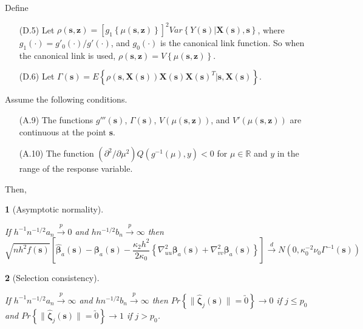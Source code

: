 \documentclass[12pt,english,authoryear, review]{article}\usepackage[]{graphicx}\usepackage[]{color}
\theoremstyle{plain}
\newtheorem{thm}{\protect\theoremname}
\theoremstyle{plain}
\providecommand{\theoremname}{Theorem}
\begin{document}
Define
\begin{itemize}
\item[(D.5)] Let $\rho\left(\bm{s},\bm{z}\right)=\left[g_{1}\left\{ \mu\left(\bm{s},\bm{z}\right)\right\} \right]^{2}Var\left\{ Y\left(\bm{s}\right)|\bm{X}\left(\bm{s}\right),\bm{s}\right\} $,
where $g_{1}\left(\cdot\right)=g'_{0}\left(\cdot\right)/g'\left(\cdot\right)$,
and $g_{0}\left(\cdot\right)$ is the canonical link function. So
when the canonical link is used, $\rho\left(\bm{s},\bm{z}\right)=V\left\{ \mu\left(\bm{s},\bm{z}\right)\right\} $.
\item[(D.6)] Let $\Gamma\left(\bm{s}\right)=E\left\{ \rho\left(\bm{s},\bm{X}\left(\bm{s}\right)\right)\bm{X}\left(\bm{s}\right)\bm{X}\left(\bm{s}\right)^{T}|\bm{s},\bm{X}\left(\bm{s}\right)\right\} $.
\end{itemize}
Assume the following conditions.
\begin{itemize}
\item[(A.9)] The functions $g'''\left(\bm{s}\right)$, $\Gamma\left(\bm{s}\right)$,
$V\left(\mu\left(\bm{s},\bm{z}\right)\right)$, and $V'\left(\mu\left(\bm{s},\bm{z}\right)\right)$
are continuous at the point $\bm{s}$.
\item[(A.10)] The function $\left(\partial^{2}/\partial\mu^{2}\right)Q\left(g^{-1}\left(\mu\right),y\right)<0$
for $\mu\in\mathbb{R}$ and $y$ in the range of the response variable.
\end{itemize}
Then,
\begin{thm}[Asymptotic normality]
\label{theorem:normality-glm} 



If $h^{-1}n^{-1/2}a_{n}\xrightarrow{p}0$ and $hn^{-1/2}b_{n}\xrightarrow{p}\infty$
then 
\[
\sqrt{nh^{2}f\left(\bm{s}\right)}\left[\hat{\bm{\beta}}_{a}(\bm{s})-\bm{\beta}_{a}(\bm{s})-\frac{\kappa_{2}h^{2}}{2\kappa_{0}}\left\{ \nabla_{uu}^{2}\bm{\beta}_{a}(\bm{s})+\nabla_{vv}^{2}\bm{\beta}_{a}(\bm{s})\right\} \right]\xrightarrow{d}N\left(0,\kappa_{0}^{-2}\nu_{0}\Gamma^{-1}(\bm{s})\right)
\]

\end{thm}

\begin{thm}[Selection consistency]
\label{theorem:selection-glm}



If $h^{-1}n^{-1/2}a_{n}\xrightarrow{p}\infty$ and $hn^{-1/2}b_{n}\xrightarrow{p}\infty$
then $Pr\left\{ \|\hat{\bm{\zeta}}_{j}(\bm{s})\|=\utilde{0}\right\} \to0$
if $j\le p_{0}$ and $Pr\left\{ \|\hat{\bm{\zeta}}_{j}(\bm{s})\|=\utilde{0}\right\} \to1$
if $j>p_{0}$. 
\end{thm}
\end{document}
